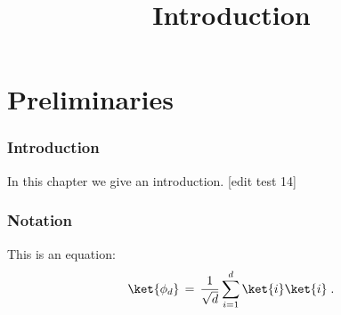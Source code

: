 

%
\usepackage{marginnote}


\title{Introduction}
\hypertarget{0000}{}
\reversemarginpar{}
\label{introduction}


\maketitle


\tableofcontents

\part{Preliminaries}
\hypertarget{0001}{}
\reversemarginpar{}
\label{book-part-preliminaries}

\section{Introduction}

In this chapter we give an introduction. [edit test 14]

\section{Notation}

This is an equation:
\begin{equation}
\label{eq:me-state}
 \ket{\phi_d} \,=\,\frac{1}{\sqrt{d}} \sum_{i=1}^d \ket{i}\ket{i}\;.
\end{equation}








